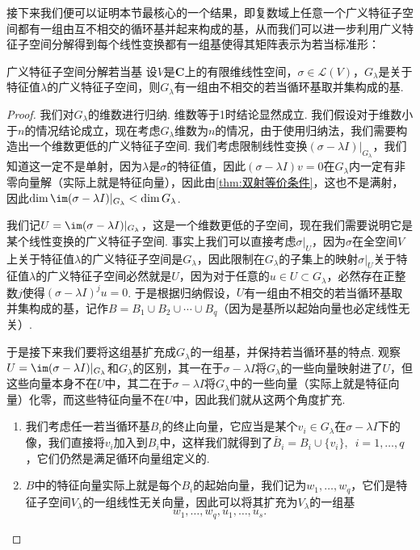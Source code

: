 接下来我们便可以证明本节最核心的一个结果，即复数域上任意一个广义特征子空间都有一组由互不相交的循环基并起来构成的基，从而我们可以进一步利用广义特征子空间分解得到每个线性变换都有一组基使得其矩阵表示为若当标准形：
\begin{theorem}{}{广义特征子空间分解若当基}
    设$V$是$\mathbf{C}$上的有限维线性空间，$\sigma\in\mathcal{L}(V)$，$G_\lambda$是关于特征值$\lambda$的广义特征子空间，则$G_\lambda$有一组由不相交的若当循环基取并集构成的基.
\end{theorem}
\begin{proof}
    我们对$G_\lambda$的维数进行归纳. 维数等于1时结论显然成立. 我们假设对于维数小于$n$的情况结论成立，现在考虑$G_\lambda$维数为$n$的情况，由于使用归纳法，我们需要构造出一个维数更低的广义特征子空间. 我们考虑限制线性变换$(\sigma-\lambda I)\vert_{G_\lambda}$，我们知道这一定不是单射，因为$\lambda$是$\sigma$的特征值，因此$(\sigma-\lambda I)v=0$在$G_\lambda$内一定有非零向量解（实际上就是特征向量），因此由\autoref{thm:双射等价条件}，这也不是满射，因此$\dim\im(\sigma-\lambda I)\vert_{G_\lambda}<\dim G_\lambda$.

    我们记$U=\im(\sigma-\lambda I)\vert_{G_\lambda}$，这是一个维数更低的子空间，现在我们需要说明它是某个线性变换的广义特征子空间. 事实上我们可以直接考虑$\sigma\vert_U$，因为$\sigma$在全空间$V$上关于特征值$\lambda$的广义特征子空间是$G_\lambda$，因此限制在$G_\lambda$的子集上的映射$\sigma\vert_U$关于特征值$\lambda$的广义特征子空间必然就是$U$，因为对于任意的$u\in U\subset G_\lambda$，必然存在正整数$j$使得$(\sigma-\lambda I)^ju=0$. 于是根据归纳假设，$U$有一组由不相交的若当循环基取并集构成的基，记作$B=B_1\cup B_2\cup\cdots\cup B_q$（因为是基所以起始向量也必定线性无关）.

    于是接下来我们要将这组基扩充成$G_\lambda$的一组基，并保持若当循环基的特点. 观察$U=\im(\sigma-\lambda I)\vert_{G_\lambda}$和$G_\lambda$的区别，其一在于$\sigma-\lambda I$将$G_\lambda$的一些向量映射进了$U$，但这些向量本身不在$U$中，其二在于$\sigma-\lambda I$将$G_\lambda$中的一些向量（实际上就是特征向量）化零，而这些特征向量不在$U$中，因此我们就从这两个角度扩充.
    \begin{enumerate}
        \item 我们考虑任一若当循环基$B_i$的终止向量，它应当是某个$v_i\in G_\lambda$在$\sigma-\lambda I$下的像，我们直接将$v_i$加入到$B_i$中，这样我们就得到了$\tilde{B_i}=B_i\cup\{v_i\},\enspace i=1,\ldots,q$，它们仍然是满足循环向量组定义的.
        \item $B$中的特征向量实际上就是每个$B_i$的起始向量，我们记为$w_1,\ldots,w_q$，它们是特征子空间$V_\lambda$的一组线性无关向量，因此可以将其扩充为$V_\lambda$的一组基
              \[w_1,\ldots,w_q,u_1,\ldots,u_s.\]
    \end{enumerate}


\end{proof}

